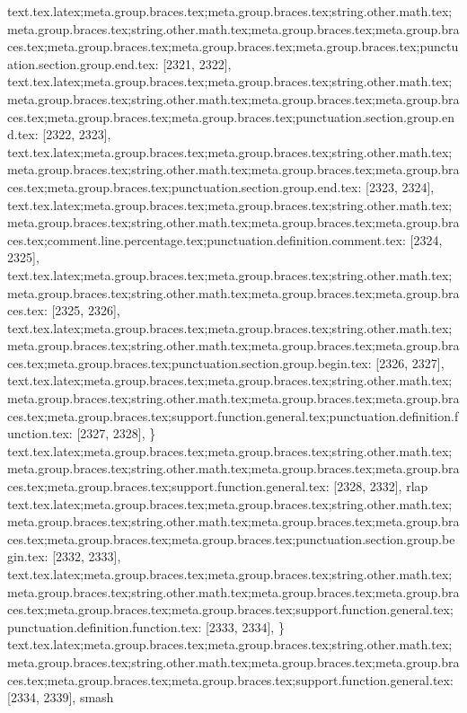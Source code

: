 {{{{{{{{{{{{{{{{{{{{{{{{{{{{{{{{{{{{{{{{{{{{{{{{{{{{{{{{{{{{{{{{{{{{{{{{{{{{{{{{{text.tex.latex;meta.group.braces.tex;meta.group.braces.tex;string.other.math.tex;meta.group.braces.tex;string.other.math.tex;meta.group.braces.tex;meta.group.braces.tex;meta.group.braces.tex;meta.group.braces.tex;meta.group.braces.tex;punctuation.section.group.end.tex: [2321, 2322], {}}
text.tex.latex;meta.group.braces.tex;meta.group.braces.tex;string.other.math.tex;meta.group.braces.tex;string.other.math.tex;meta.group.braces.tex;meta.group.braces.tex;meta.group.braces.tex;meta.group.braces.tex;punctuation.section.group.end.tex: [2322, 2323], {}}
text.tex.latex;meta.group.braces.tex;meta.group.braces.tex;string.other.math.tex;meta.group.braces.tex;string.other.math.tex;meta.group.braces.tex;meta.group.braces.tex;meta.group.braces.tex;punctuation.section.group.end.tex: [2323, 2324], {}}
text.tex.latex;meta.group.braces.tex;meta.group.braces.tex;string.other.math.tex;meta.group.braces.tex;string.other.math.tex;meta.group.braces.tex;meta.group.braces.tex;comment.line.percentage.tex;punctuation.definition.comment.tex: [2324, 2325], {%
text.tex.latex;meta.group.braces.tex;meta.group.braces.tex;string.other.math.tex;meta.group.braces.tex;string.other.math.tex;meta.group.braces.tex;meta.group.braces.tex: [2325, 2326], {
}
text.tex.latex;meta.group.braces.tex;meta.group.braces.tex;string.other.math.tex;meta.group.braces.tex;string.other.math.tex;meta.group.braces.tex;meta.group.braces.tex;meta.group.braces.tex;punctuation.section.group.begin.tex: [2326, 2327], {{}
text.tex.latex;meta.group.braces.tex;meta.group.braces.tex;string.other.math.tex;meta.group.braces.tex;string.other.math.tex;meta.group.braces.tex;meta.group.braces.tex;meta.group.braces.tex;support.function.general.tex;punctuation.definition.function.tex: [2327, 2328], {\}
text.tex.latex;meta.group.braces.tex;meta.group.braces.tex;string.other.math.tex;meta.group.braces.tex;string.other.math.tex;meta.group.braces.tex;meta.group.braces.tex;meta.group.braces.tex;support.function.general.tex: [2328, 2332], {rlap}
text.tex.latex;meta.group.braces.tex;meta.group.braces.tex;string.other.math.tex;meta.group.braces.tex;string.other.math.tex;meta.group.braces.tex;meta.group.braces.tex;meta.group.braces.tex;meta.group.braces.tex;punctuation.section.group.begin.tex: [2332, 2333], {{}
text.tex.latex;meta.group.braces.tex;meta.group.braces.tex;string.other.math.tex;meta.group.braces.tex;string.other.math.tex;meta.group.braces.tex;meta.group.braces.tex;meta.group.braces.tex;meta.group.braces.tex;support.function.general.tex;punctuation.definition.function.tex: [2333, 2334], {\}
text.tex.latex;meta.group.braces.tex;meta.group.braces.tex;string.other.math.tex;meta.group.braces.tex;string.other.math.tex;meta.group.braces.tex;meta.group.braces.tex;meta.group.braces.tex;meta.group.braces.tex;support.function.general.tex: [2334, 2339], {smash}
}}}}}}}}}}}}}}}}}}}}}}}}}}}}}}}}}}}}}}}}}}}}}}}}}}}}}}}}}}}}}}}}}}}}}}}}}}}}}}}}}}}
